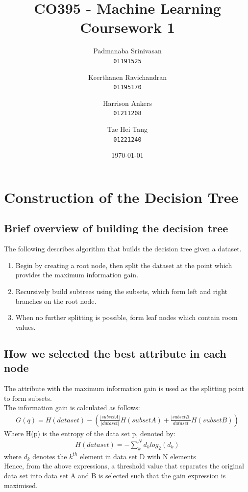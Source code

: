 \documentclass{article}
\title{CO395 - Machine Learning Coursework 1}
\author{
    Padmanaba Srinivasan \\
    \texttt{01191525}
    \and
    Keerthanen Ravichandran \\
    \texttt{01195170}
    \and
    Harrison Ankers \\
    \texttt{01211208}
    \and
    Tze Hei Tang \\
    \texttt{01221240}
}
\date{\today}
\begin{document}
\maketitle
\newpage
\tableofcontents
\newpage

\section{Construction of the Decision Tree}
\subsection{Brief overview of building the decision tree}
The following describes algorithm that builds the decision tree given a dataset.
\begin{enumerate}
    \item Begin by creating a root node, then split the dataset at the point which provides the maximum information gain.
    \item Recursively build subtrees using the subsets, which form left and right branches on the root node.
    \item When no further splitting is possible, form leaf nodes which contain room values.
\end{enumerate}

\subsection{How we selected the best attribute in each node}
The attribute with the maximum information gain is used as the splitting point to form subsets.\\
The information gain is calculated as follows:\\
\begin{align}
    \label{decisiontree:f1}
	 G(q) = H(dataset) - (  \frac{|subsetA|}{|dataset|} H(subsetA) + \frac{|subsetB|}{dataset} H(subsetB) )
    \end{align}
Where H(p) is the entropy of the data set p, denoted by:
\begin{align}
    \label{decisiontree:f2}
    H(dataset) = - \sum_{k}^{N} d_{k}log_{2}(d_{k})
\end{align}
where $d_{k}$ denotes the $k^{th}$ element in data set D with N elements\\

Hence, from the above expressions, a threshold value that separates the original data set into data set A and B is selected such that the gain expression is maximised.
\end{document}
